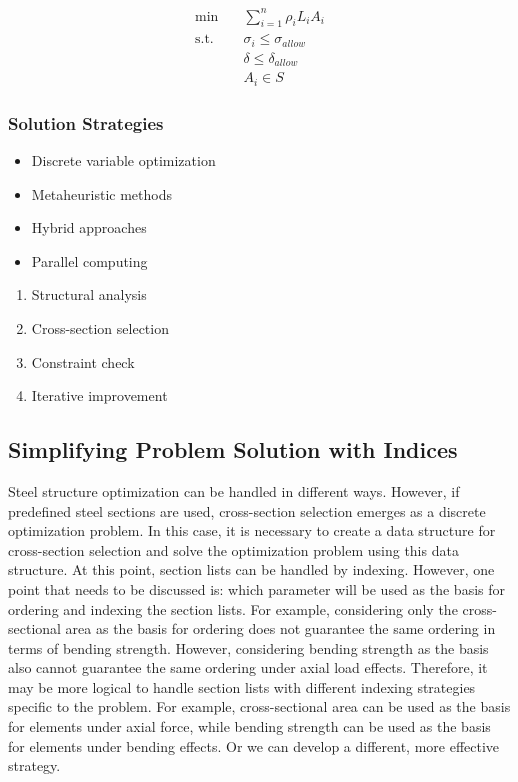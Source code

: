 \begin{equation}
\begin{aligned}
\min & \quad \sum_{i=1}^n \rho_i L_i A_i \\
\text{s.t.} & \quad \sigma_i \leq \sigma_{allow} \\
& \quad \delta \leq \delta_{allow} \\
& \quad A_i \in S
\end{aligned}
\end{equation}

\subsubsection{Solution Strategies}
\begin{itemize}
    \item Discrete variable optimization
    \item Metaheuristic methods
    \item Hybrid approaches
    \item Parallel computing
\end{itemize}

\begin{tcolorbox}[title=Optimization Process]
\begin{enumerate}
    \item Structural analysis
    \item Cross-section selection
    \item Constraint check
    \item Iterative improvement
\end{enumerate}
\end{tcolorbox}

\subsection{Simplifying Problem Solution with Indices}
Steel structure optimization can be handled in different ways. However, if predefined steel sections are used, cross-section selection emerges as a discrete optimization problem. In this case, it is necessary to create a data structure for cross-section selection and solve the optimization problem using this data structure. At this point, section lists can be handled by indexing. However, one point that needs to be discussed is: which parameter will be used as the basis for ordering and indexing the section lists. For example, considering only the cross-sectional area as the basis for ordering does not guarantee the same ordering in terms of bending strength. However, considering bending strength as the basis also cannot guarantee the same ordering under axial load effects. Therefore, it may be more logical to handle section lists with different indexing strategies specific to the problem. For example, cross-sectional area can be used as the basis for elements under axial force, while bending strength can be used as the basis for elements under bending effects. Or we can develop a different, more effective strategy.

